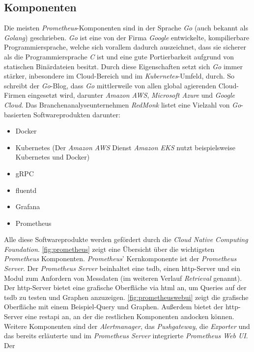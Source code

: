 \documentclass[titlepage]{report}
\begin{document}
\subsection{Komponenten}
Die meisten \emph{Prometheus}\hyp{}Komponenten sind in der Sprache
\emph{Go} (auch bekannt als \emph{Golang}) geschrieben. \emph{Go} ist
eine von der Firma \emph{Google} entwickelte, kompilierbare
Programmiersprache, welche sich vorallem dadurch auszeichnet, dass sie
sicherer als die Programmiersprache \emph{C} ist und eine gute
Portierbarkeit aufgrund von statischen Binärdateien besitzt. Durch diese
Eigenschaften setzt sich \emph{Go} immer stärker, inbesondere im
Cloud\hyp{}Bereich und im \emph{Kubernetes}\hyp{}Umfeld, durch\cite{INFOWORLD}.
So schreibt der \emph{Go}\hyp{}Blog, dass \emph{Go} mittlerweile von
allen global agierenden Cloud\hyp{}Firmen eingesetzt wird, darunter
\emph{Amazon AWS}, \emph{Microsoft Azure} und \emph{Google
Cloud}\cite{GOBLOG}. Das
Branchenanalyseunternehmen \emph{RedMonk} listet eine Vielzahl von
\emph{Go}\hyp{}basierten Softwareprodukten darunter\cite{REDMONK}:
\begin{itemize}
    \item Docker
    \item Kubernetes (Der \emph{Amazon AWS} Dienst \emph{Amazon EKS} nutzt
        beispielsweise Kubernetes und Docker)
    \item gRPC
    \item fluentd
    \item Grafana
    \item Prometheus
\end{itemize}
Alle diese Softwareprodukte werden gefördert durch die \emph{Cloud
Native Computing Foundation}\cite{CNCFLANDSCAPE}.
\autoref{fig:prometheus} zeigt eine Übersicht über die wichtigsten
\emph{Prometheus} Komponenten.
\emph{Prometheus}' Kernkomponente ist der \emph{Prometheus Server}. Der \emph{Prometheus
Server} beinhaltet eine \gls{tsdb}, einen \gls{http}\hyp{}Server und ein
Modul zum Anfordern von Messdaten (im weiteren Verlauf
\emph{Retrieval} genannt). Der \gls{http}\hyp{}Server bietet eine grafische
Oberfläche via \gls{html} an, um Queries auf der \gls{tsdb} zu testen
und Graphen anzuzeigen. \autoref{fig:prometheuswebui} zeigt
die grafische Oberfläche mit einem Beispiel\hyp{}Query und Graphen.
Außerdem bietet der \gls{http}\hyp{}Server
eine \gls{restapi} an, an der die restlichen Komponenten andocken
können. Weitere Komponenten sind der \emph{Alertmanager}, das
\emph{Pushgateway}, die \emph{Exporter} und das bereits erläuterte und
im \emph{Prometheus Server} integrierte \emph{Prometheus Web UI}. Der
\end{document}
